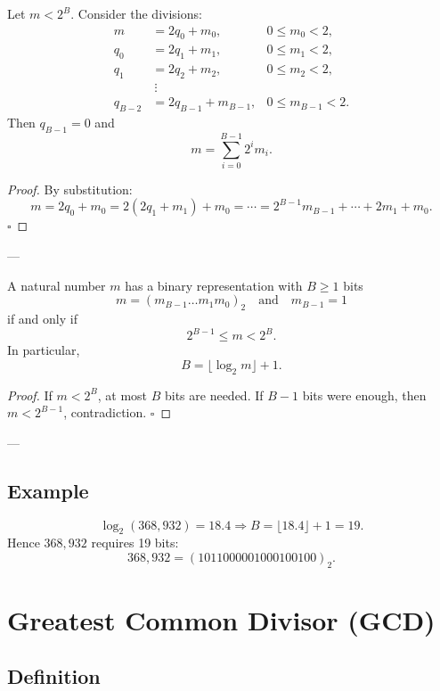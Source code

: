\begin{proposition}
Let \(m < 2^B\). Consider the divisions:
\[
\begin{aligned}
m &= 2q_0 + m_0, & 0 \le m_0 < 2, \\
q_0 &= 2q_1 + m_1, & 0 \le m_1 < 2, \\
q_1 &= 2q_2 + m_2, & 0 \le m_2 < 2, \\
&\ \vdots \\
q_{B-2} &= 2q_{B-1} + m_{B-1}, & 0 \le m_{B-1} < 2.
\end{aligned}
\]
Then \(q_{B-1} = 0\) and
\[
m = \sum_{i=0}^{B-1} 2^i m_i.
\]
\end{proposition}

\begin{proof}
By substitution:
\[
m = 2q_0 + m_0 = 2(2q_1 + m_1) + m_0 = \cdots = 2^{B-1} m_{B-1} + \cdots + 2m_1 + m_0.
\]
\hfill\(\square\)
\end{proof}

---

\begin{corollary}
A natural number \(m\) has a binary representation with \(B \ge 1\) bits
\[
m = (m_{B-1}\ldots m_1 m_0)_2 \quad \text{and} \quad m_{B-1} = 1
\]
if and only if
\[
2^{B-1} \le m < 2^B.
\]
In particular,
\[
B = \lfloor \log_2 m \rfloor + 1.
\]
\end{corollary}

\begin{proof}
If \(m < 2^B\), at most \(B\) bits are needed.  
If \(B-1\) bits were enough, then \(m < 2^{B-1}\), contradiction.  
\hfill\(\square\)
\end{proof}

---

\subsection{Example}
\[
\log_2(368{,}932) = 18.4 \Rightarrow B = \lfloor 18.4 \rfloor + 1 = 19.
\]
Hence \(368{,}932\) requires 19 bits:
\[
368{,}932 = (1011000001000100100)_2.
\]

\section{Greatest Common Divisor (GCD)}

\subsection{Definition}

